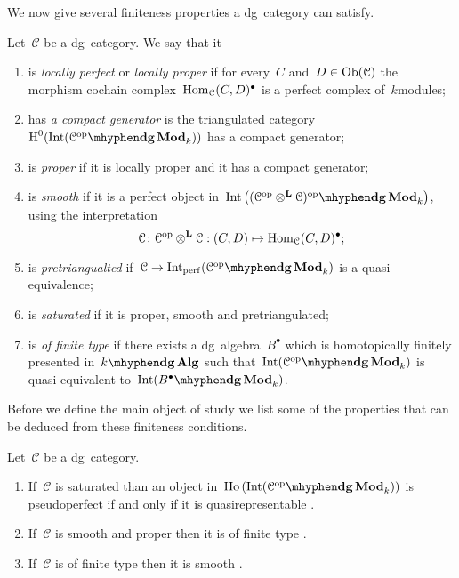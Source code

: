 \begin{refsection}
We now give several finiteness properties a dg~category can satisfy.
\begin{definition}
  Let~$\mathcal{C}$ be a dg~category. We say that it
  \begin{enumerate}
    \item is \emph{locally perfect} or \emph{locally proper} if for every~$C$ and~$D\in\operatorname{Ob}(\mathcal{C})$ the morphism cochain complex~$\mathrm{Hom}_{\mathcal{C}}(C,D)^\bullet$ is a perfect complex of~$k$\dash modules;
    \item has \emph{a compact generator} is the triangulated category~$\HH^0(\Int(\dgMod{\mathcal{C}^\opp}_k))$ has a compact generator;
    \item is \emph{proper} if it is locally proper and it has a compact generator;
    \item is \emph{smooth} if it is a perfect object in~$\Int\left( \dgMod{(\mathcal{C}^\opp\otimes^{\mathbf{L}}\mathcal{C})^\opp}_k \right)$, using the interpretation
      \begin{equation}
        \mathcal{C}\colon\mathcal{C}^{\mathrm{op}}\otimes^{\mathbf{L}}\mathcal{C}:(C,D)\mapsto\mathrm{Hom}_{\mathcal{C}}(C,D)^\bullet;
      \end{equation}
    \item is \emph{pretriangualted} if~$\mathcal{C}\to\Int_\perf(\dgMod{\mathcal{C}^\opp}_k)$ is a quasi-equivalence;
    \item is \emph{saturated} if it is proper, smooth and pretriangulated;
    \item is \emph{of finite type} if there exists a dg~algebra~$B^\bullet$ which is homotopically finitely presented in~$\dgAlg$ such that~$\Int(\dgMod{\mathcal{C}^\opp}_k)$ is quasi-equivalent to~$\Int(\dgMod{B^\bullet}_k)$.
  \end{enumerate}
\end{definition}
Before we define the main object of study we list some of the properties that can be deduced from these finiteness conditions.
\begin{proposition}
  \label{proposition:dg-properties}
  Let~$\mathcal{C}$ be a dg~category.
  \begin{enumerate}
    \item If~$\mathcal{C}$ is saturated than an object in~$\Ho(\Int(\dgMod{\mathcal{C}^\opp}_k))$ is pseudoperfect if and only if it is quasirepresentable \cite[corollary 2.9(2)]{toen-vaquie}.
    \item If~$\mathcal{C}$ is smooth and proper then it is of finite type \cite[corollary 2.13]{toen-vaquie}.
    \item If~$\mathcal{C}$ is of finite type then it is smooth \cite[corollary 2.14]{toen-vaquie}.
  \end{enumerate}
\end{proposition}


\end{refsection}
